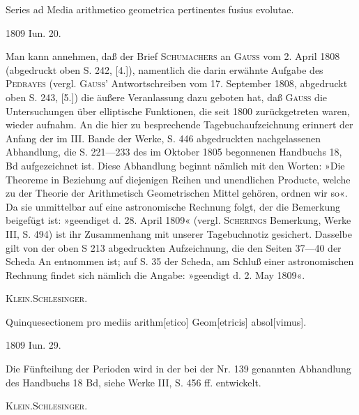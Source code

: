 \clearpage{}
\noindent\hspace*{\parindent}Series ad Media arithmetico geometrica pertinentes fusius evolutae.
\par\noindent\hfill 1809 Iun. 20.
\par\medskip\begingroup\small
\noindent\hspace*{\parindent}Man kann annehmen, daß der Brief \textsc{Schumachers} an \textsc{Gauss} vom 2. April 1808 (abgedruckt oben S. 242, [4.]), namentlich die darin erwähnte Aufgabe des \textsc{Pedrayes} (vergl. \textsc{Gauss}' Antwortschreiben vom 17. September 1808, abgedruckt oben S. 243, [5.]) die äußere Veranlassung dazu geboten hat, daß \textsc{Gauss} die Untersuchungen über elliptische Funktionen, die seit 1800 zurückgetreten waren, wieder aufnahm. An die hier zu besprechende Tagebuchaufzeichnung erinnert der Anfang der im III. Bande der Werke, S. 446 abgedruckten nachgelassenen Abhandlung, die S. 221—233 des im Oktober 1805 begonnenen Handbuchs 18, Bd aufgezeichnet ist. Diese Abhandlung beginnt nämlich mit den Worten: »Die Theoreme in Beziehung auf diejenigen Reihen und unendlichen Producte, welche zu der Theorie der Arithmetisch Geometrischen Mittel gehören, ordnen wir so«. Da sie unmittelbar auf eine astronomische Rechnung folgt, der die Bemerkung beigefügt ist: »geendiget d. 28. April 1809« (vergl. \textsc{Scherings} Bemerkung, Werke III, S. 494) ist ihr Zusammenhang mit unserer Tagebuchnotiz gesichert. Dasselbe gilt von der oben S 213 abgedruckten Aufzeichnung, die den Seiten 37—40 der Scheda An entnommen ist; auf S. 35 der Scheda, am Schluß einer astronomischen Rechnung findet sich nämlich die Angabe: »geendigt d. 2. May 1809«.
\par\noindent\hfill\textsc{Klein.\quad Schlesinger.}
\par\endgroup

\noindent\hspace*{\parindent}Quinquesectionem pro mediis arithm[etico] Geom[etricis] absol[vimus].
\par\noindent\hfill 1809 Iun. 29.
\par\medskip\begingroup\small
\noindent\hspace*{\parindent}Die Fünfteilung der Perioden wird in der bei der Nr. 139 genannten Abhandlung des Handbuchs 18 Bd, siehe Werke III, S. 456 ff. entwickelt.
\par\noindent\hfill\textsc{Klein.\quad Schlesinger.}
\par\endgroup

